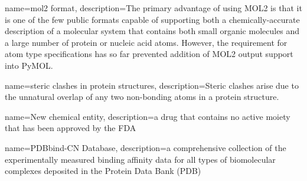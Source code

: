 {
    name=mol2 format,
    description={The primary advantage of using MOL2 is that it is one of the few public formats capable of supporting both a chemically-accurate description of a molecular system that contains both small organic molecules and a large number of protein or nucleic acid atoms. However, the requirement for atom type specifications has so far prevented addition of MOL2 output support into PyMOL.}
}

{
    name=steric clashes in protein structures,
    description={Steric clashes arise due to the unnatural overlap of any two non-bonding atoms in a protein structure.}
}

{
    name=New chemical entity,
    description={a drug that contains no active moiety that has been approved by the FDA}
}


{
    name=PDBbind-CN Database,
    description={a comprehensive collection of the experimentally measured binding affinity data for all types of biomolecular complexes deposited in the Protein Data Bank (PDB)}
}

